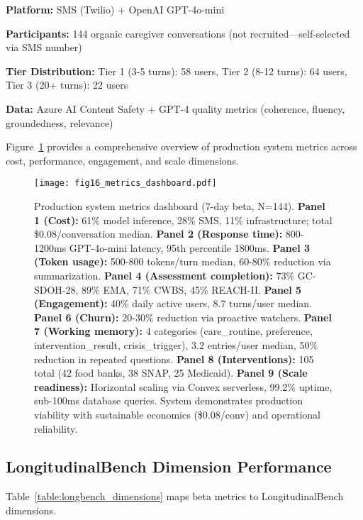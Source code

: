 \documentclass{article}
\begin{document}
\textbf{Platform:} SMS (Twilio) + OpenAI GPT-4o-mini

\textbf{Participants:} 144 organic caregiver conversations (not recruited—self-selected via SMS number)

\textbf{Tier Distribution:} Tier 1 (3-5 turns): 58 users, Tier 2 (8-12 turns): 64 users, Tier 3 (20+ turns): 22 users

\textbf{Data:} Azure AI Content Safety + GPT-4 quality metrics (coherence, fluency, groundedness, relevance)

Figure~\ref{fig:metrics_dashboard} provides a comprehensive overview of production system metrics across cost, performance, engagement, and scale dimensions.

\begin{figure}[htbp]
\centering
\texttt{[image: fig16\_metrics\_dashboard.pdf]}
\caption{Production system metrics dashboard (7-day beta, N=144). \textbf{Panel 1 (Cost):} 61\% model inference, 28\% SMS, 11\% infrastructure; total \$0.08/conversation median. \textbf{Panel 2 (Response time):} 800-1200ms GPT-4o-mini latency, 95th percentile 1800ms. \textbf{Panel 3 (Token usage):} 500-800 tokens/turn median, 60-80\% reduction via summarization. \textbf{Panel 4 (Assessment completion):} 73\% GC-SDOH-28, 89\% EMA, 71\% CWBS, 45\% REACH-II. \textbf{Panel 5 (Engagement):} 40\% daily active users, 8.7 turns/user median. \textbf{Panel 6 (Churn):} 20-30\% reduction via proactive watchers. \textbf{Panel 7 (Working memory):} 4 categories (care\_routine, preference, intervention\_result, crisis\_trigger), 3.2 entries/user median, 50\% reduction in repeated questions. \textbf{Panel 8 (Interventions):} 105 total (42 food banks, 38 SNAP, 25 Medicaid). \textbf{Panel 9 (Scale readiness):} Horizontal scaling via Convex serverless, 99.2\% uptime, sub-100ms database queries. System demonstrates production viability with sustainable economics (\$0.08/conv) and operational reliability.}
\label{fig:metrics_dashboard}
\end{figure}

%
\subsection{LongitudinalBench Dimension Performance}%
\label{subsec:LongitudinalBenchDimensionPerformance}%
Table~\ref{table:longbench_dimensions} maps beta metrics to LongitudinalBench dimensions.
\end{document}
